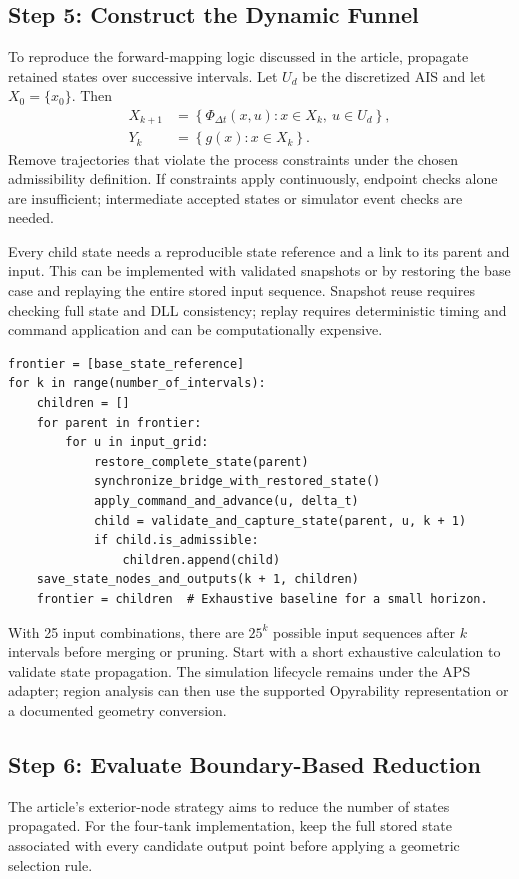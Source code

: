\documentclass[11pt, letterpaper]{article}
\begin{document}
\subsection{Step 5: Construct the Dynamic Funnel}
To reproduce the forward-mapping logic discussed in the article, propagate retained states over successive intervals. Let $U_d$ be the discretized AIS and let $X_0=\{x_0\}$. Then
\begin{align}
X_{k+1} &= \left\{\Phi_{\Delta t}(x,u): x\in X_k,\ u\in U_d\right\},\\
Y_k &= \left\{g(x):x\in X_k\right\}.
\end{align}
Remove trajectories that violate the process constraints under the chosen admissibility definition. If constraints apply continuously, endpoint checks alone are insufficient; intermediate accepted states or simulator event checks are needed.

Every child state needs a reproducible state reference and a link to its parent and input. This can be implemented with validated snapshots or by restoring the base case and replaying the entire stored input sequence. Snapshot reuse requires checking full state and DLL consistency; replay requires deterministic timing and command application and can be computationally expensive.

\begin{lstlisting}[style=pythonstyle,caption={Conceptual propagation algorithm; not a package API}]
frontier = [base_state_reference]
for k in range(number_of_intervals):
    children = []
    for parent in frontier:
        for u in input_grid:
            restore_complete_state(parent)
            synchronize_bridge_with_restored_state()
            apply_command_and_advance(u, delta_t)
            child = validate_and_capture_state(parent, u, k + 1)
            if child.is_admissible:
                children.append(child)
    save_state_nodes_and_outputs(k + 1, children)
    frontier = children  # Exhaustive baseline for a small horizon.
\end{lstlisting}

With 25 input combinations, there are $25^k$ possible input sequences after $k$ intervals before merging or pruning. Start with a short exhaustive calculation to validate state propagation. The simulation lifecycle remains under the APS adapter; region analysis can then use the supported Opyrability representation or a documented geometry conversion.

\subsection{Step 6: Evaluate Boundary-Based Reduction}
The article's exterior-node strategy aims to reduce the number of states propagated. For the four-tank implementation, keep the full stored state associated with every candidate output point before applying a geometric selection rule.
\end{document}
